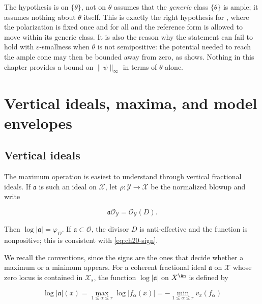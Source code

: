 \begin{warning}{The hypothesis is on $\{\theta\}$, not on $\theta$}
 assumes that the \emph{generic}
class $\{\theta\}$ is ample; it assumes nothing about $\theta$ itself.
This is exactly the right hypothesis for , where the
polarization is fixed once and for all and the reference form is allowed to
move within its generic class.  It is also the reason why the statement can
fail to hold with $\varepsilon$-smallness when $\theta$ is not
semipositive: the potential needed to reach the ample cone may then be
bounded away from zero, as
 shows.  Nothing in this chapter
provides a bound on $\|\psi\|_\infty$ in terms of $\theta$ alone.
\end{warning}

\section{Vertical ideals, maxima, and model envelopes}
\label{sec:ch20-max-envelopes}

\subsection{Vertical ideals}
\label{sec:ch20-vertical-ideals}

The maximum operation is easiest to understand through vertical fractional
ideals.  If $\mathfrak a$ is such an ideal on $\mathcal X$, let
$\rho:\mathcal Y\to\mathcal X$ be the normalized blowup and write

\begin{equation}
\label{eq:ch20-ideal-divisor}
             \mathfrak a\mathcal O_{\mathcal Y}
                    =\mathcal O_{\mathcal Y}(D).
\end{equation}

Then $\log|\mathfrak a|=\varphi_D$.  If $\mathfrak a\subset\mathcal O$,
the divisor $D$ is anti-effective and the function is nonpositive; this is
consistent with \eqref{eq:ch20-sign}.

We recall the conventions, since the signs are the ones that decide whether
a maximum or a minimum appears.  For a coherent fractional ideal
$\mathfrak a$ on $\mathcal X$ whose zero locus is contained in
$\mathcal X_s$, the function $\log|\mathfrak a|$ on $X^{\An}$ is
defined by

\begin{equation}
\label{eq:ch20-log-ideal}
 \log|\mathfrak a|(x)=\max_{1\le\alpha\le r}\log|f_\alpha(x)|
 =-\min_{1\le\alpha\le r}v_x(f_\alpha)
\end{equation}

